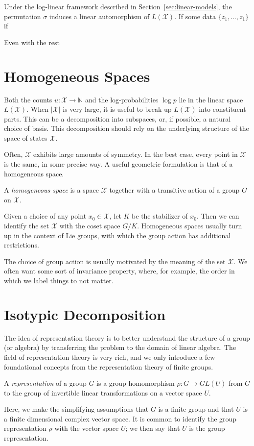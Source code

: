 \documentclass[cclicense]{hmcthesis}
\providecommand*{\xs}{\mathcal X}
\providecommand*{\N}{\mathbb{N}}
\numberwithin{equation}{chapter}
\numberwithin{thmcounter}{chapter}
\begin{document}
    Under the log-linear framework described in Section~\ref{sec:linear-models},
    the permutation $\sigma$ induces a linear automorphism of $L(\xs)$.  If some
    data $\{z_1, \ldots, z_1\}$
    if 

    Even with the rest

\section{Homogeneous Spaces}
    Both the counts $u: \xs \to \N$ and the log-probabilities $\log p$ lie in
    the linear space $L(\xs)$.  When $|\xs|$ is very large, it is useful to
    break up $L(\xs)$ into constituent parts.  This can be a decomposition into
    subspaces, or, if possible, a natural choice of basis.  This
    decomposition should rely on the underlying structure of the space of states
    $\xs$.

    Often, $\xs$ exhibits large amounts of symmetry.  In the best case, every
    point in $\xs$ is the same, in some precise way.  A useful geometric
    formulation is that of a homogeneous space.
    \begin{definition}
        A \emph{homogeneous space} is a space $\xs$ together with a transitive
        action of a group $G$ on $\xs$.
    \end{definition}
    Given a choice of any point $x_0 \in \xs$, let $K$ be the stabilizer of
    $x_0$.  Then we can identify the set $\xs$ with the coset space $G / K$.
    Homogeneous spaces usually turn up in the context of Lie groups, with which
    the group action has additional restrictions.

    The choice of group action is usually motivated by the meaning of the set
    $\xs$.  We often want some sort of invariance property, where, for example,
    the order in which we label things to not matter.

\section{Isotypic Decomposition}
    
    The idea of representation theory is to better understand the structure of a
    group (or algebra) by transferring the problem to the domain of linear
    algebra.  The field of representation theory is very rich, and we only
    introduce a few foundational concepts from the representation theory of
    finite groups.

    \begin{definition}
        A \emph{representation} of a group $G$ is a group homomorphism $\rho: G
        \to GL(U)$ from $G$ to the group of invertible linear transformations on
        a vector space $U$.  
    \end{definition}
    Here, we make the simplifying assumptions that $G$ is a finite group and
    that $U$ is a finite dimensional complex vector space.  It is common to
    identify the group representation $\rho$ with the vector space $U$; we then
    say that $U$ is the group representation.
\end{document}
